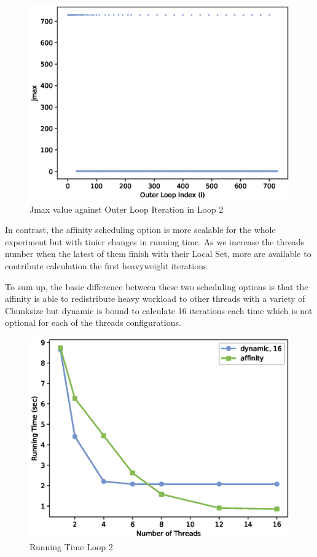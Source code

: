 \documentclass[12pt,a4paper]{article}
\begin{document}
\begin{figure}[h!]
    \centering
    \includegraphics[scale=0.6]{../graphs/jmax.eps}
    \caption{Jmax value against Outer Loop Iteration in Loop 2}
    \label{jmax}
\end{figure}

In contrast, the affinity scheduling option is more scalable for the whole experiment but with tinier changes in running time. As we increase the threads number when the latest of them finish with their Local Set, more are available to contribute calculation the first heavyweight iterations.

To sum up, the basic difference between these two scheduling options is that the affinity is able to redistribute heavy workload to other threads with a variety of Chunksize but dynamic is bound to calculate 16 iterations each time which is not optional for each of the threads configurations.

\begin{figure}[h!]
    \centering
    \includegraphics[scale=0.6]{../graphs/loop2_running_time.eps}
    \caption{Running Time Loop 2}
    \label{runningTimeLoop2}
\end{figure}
\end{document}
